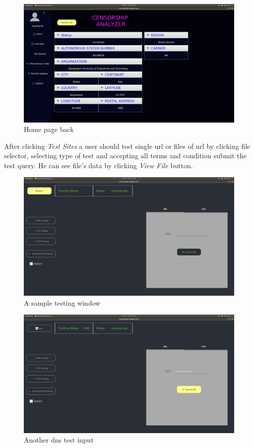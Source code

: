 \begin{figure}[h]
    \centering
    \includegraphics[width=\textwidth]{usersite/8homepage.png}
    \caption{Home page back}
    \label{fig:user8}
\end{figure}

After clicking \emph{Test Sites} a user should test single url or files of url by clicking file selector, selecting type of test and accepting all terms and condition submit the test query. He can see file's data by clicking \emph{View File} button.
\begin{figure}[h]
    \centering
    \includegraphics[width=\textwidth]{usersite/9dnstest.png}
    \caption{A sample testing window}
    \label{fig:user9}
\end{figure}

\begin{figure}[h]
    \centering
    \includegraphics[width=\textwidth]{usersite/10input.png}
    \caption{Another dns test input}
    \label{fig:user10}
\end{figure}


